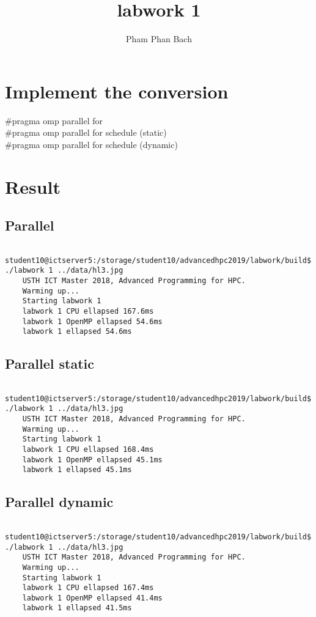 \documentclass{article}
\title{labwork 1}
\author{Pham Phan Bach }
\begin{document}
\maketitle
    
\section{Implement the conversion}
    #pragma omp parallel for \\
    #pragma omp parallel for schedule (static) \\
    #pragma omp parallel for schedule (dynamic) \\

\section{Result}

\subsection{Parallel}
\begin{verbatim}
    student10@ictserver5:/storage/student10/advancedhpc2019/labwork/build$ ./labwork 1 ../data/hl3.jpg 
    USTH ICT Master 2018, Advanced Programming for HPC.
    Warming up...
    Starting labwork 1
    labwork 1 CPU ellapsed 167.6ms
    labwork 1 OpenMP ellapsed 54.6ms
    labwork 1 ellapsed 54.6ms
\end{verbatim}{}

\subsection{Parallel static}
\begin{verbatim}
    student10@ictserver5:/storage/student10/advancedhpc2019/labwork/build$ ./labwork 1 ../data/hl3.jpg 
    USTH ICT Master 2018, Advanced Programming for HPC.
    Warming up...
    Starting labwork 1
    labwork 1 CPU ellapsed 168.4ms
    labwork 1 OpenMP ellapsed 45.1ms
    labwork 1 ellapsed 45.1ms
\end{verbatim}{}

\subsection{Parallel dynamic}
\begin{verbatim}
    student10@ictserver5:/storage/student10/advancedhpc2019/labwork/build$ ./labwork 1 ../data/hl3.jpg 
    USTH ICT Master 2018, Advanced Programming for HPC.
    Warming up...
    Starting labwork 1
    labwork 1 CPU ellapsed 167.4ms
    labwork 1 OpenMP ellapsed 41.4ms
    labwork 1 ellapsed 41.5ms
\end{verbatim}{}
\end{document}
